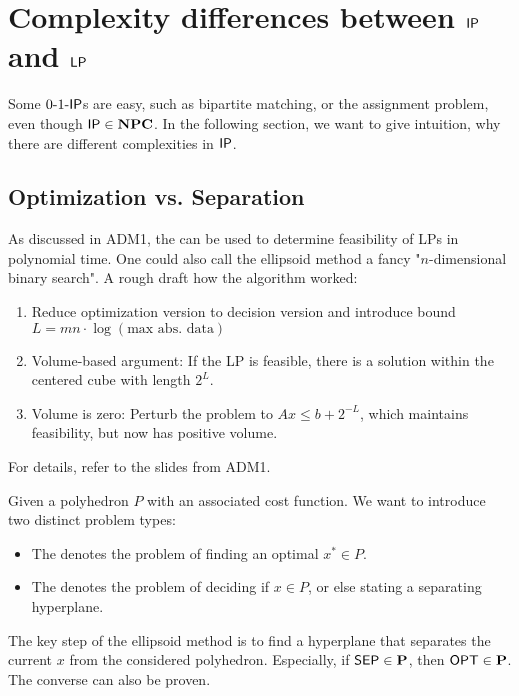 \section{Complexity differences between $\mathsf{IP}$ and $\mathsf{LP}$}
Some $\text{0-1-}\mathsf{IP}$s are easy, such as bipartite matching, or the assignment problem, even though $\mathsf{IP} \in \mathbf{NPC}$.
In the following section, we want to give intuition, why there are different complexities in $\mathsf{IP}$.
\subsection{Optimization vs. Separation}
\begin{recall}
    As discussed in ADM1, the  can be used to determine feasibility of LPs in polynomial time.
    One could also call the ellipsoid method a fancy "$n$-dimensional binary search".
    A rough draft how the algorithm worked:
    \begin{enumerate}
        \item Reduce optimization version to decision version and introduce bound $L = mn \cdot \log(\text{max abs. data})$
        \item Volume-based argument: If the LP is feasible, there is a solution within the centered cube with length $2^L$.
        \item Volume is zero: Perturb the problem to $Ax \leq b + 2^{-L}$, which maintains feasibility, but now has positive volume.
    \end{enumerate}
    For details, refer to the slides from ADM1.
\end{recall}
\begin{definition}
    Given a polyhedron $P$ with an associated cost function. We want to introduce two distinct problem types:
    \begin{itemize}
        \item The  denotes the problem of finding an optimal $x^* \in P$.
        \item The  denotes the problem of deciding if $x \in P$, or else stating a separating hyperplane.
    \end{itemize}
\end{definition}
\begin{remark}
    The key step of the ellipsoid method is to find a hyperplane that separates the current $x$ from the considered polyhedron.
    Especially, if $\mathsf{SEP} \in \mathbf{P}$, then $\mathsf{OPT} \in \mathbf{P}$. The converse can also be proven.
\end{remark}
